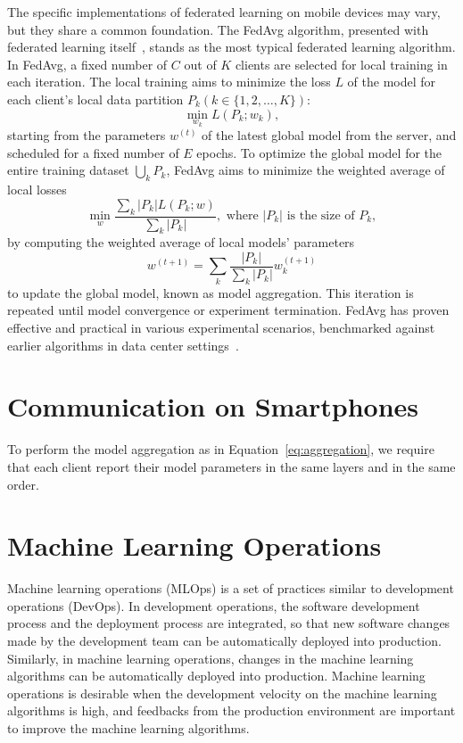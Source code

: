 The specific implementations of federated learning on mobile devices may vary,
but they share a common foundation. The FedAvg algorithm,
presented with federated learning itself~\cite{mcmahan2017communication},
stands as the most typical federated learning algorithm. In FedAvg,
a fixed number of $C$ out of $K$ clients are selected for local training in each
iteration.
The local training aims to minimize the loss $L$ of the model for each client's
local data partition $P_k (k \in \{1, 2, \dots, K\})$:
\begin{equation}
\min_{w_k} L(P_k;w_k),
\end{equation}
starting from the parameters $w^{(t)}$ of the latest global model from the
server, and scheduled for a fixed number of $E$ epochs.
To optimize the global model for the entire training dataset $\bigcup_k P_k$,
FedAvg aims to minimize the weighted average of local losses
\begin{equation}
\min_{w} \frac{\sum_k |P_k|L(P_k;w)}{\sum_k |P_k|},
\text{ where }|P_k|\text{ is the size of }P_k,
\end{equation}
by computing the weighted average of local models' parameters
\begin{equation}
    \label{eq:aggregation}
w^{(t+1)}=\sum_k \frac{|P_k|}{\sum_k |P_k|}w_k^{(t+1)}
\end{equation}
to update the global model, known as model aggregation.
This iteration is repeated until model convergence or experiment termination.
FedAvg has proven effective and practical in various experimental scenarios,
benchmarked against earlier algorithms in data center
settings~\cite{bonawitz2019towards}.

\section{Communication on Smartphones}

To perform the model aggregation as in Equation~\ref{eq:aggregation},
we require that each client report their model parameters in the same layers and
in the same order.

\section{Machine Learning Operations}

Machine learning operations (MLOps) is a set of practices similar to
development operations (DevOps).
In development operations,
the software development process and the deployment process are integrated,
so that new software changes made by the development team can be
automatically deployed into production.
Similarly, in machine learning operations,
changes in the machine learning algorithms can be automatically deployed into
production.
Machine learning operations is desirable when the development velocity on
the machine learning algorithms is high,
and feedbacks from the production environment are important to improve
the machine learning algorithms.
